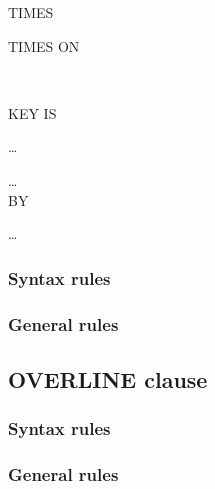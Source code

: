 \begin{syntax}
   \integer TIMES
\end{syntax}

\begin{syntax}[\miscextcolour]
  \begin{0-1}
    \integer {}
  \end{0-1}
   TIMES  ON \identifier

  \begin{0+}
    \begin{1=}
      \begin{1=}
         \\
      \end{1=}
      KEY IS
      \begin{1=}
        \identifier
      \end{1=}\ldots
    \end{1=}\ldots \\

     BY
    \begin{1=}
      \cobolindexname
    \end{1=}\ldots
  \end{0+}
\end{syntax}

\subsubsection{Syntax rules}

\subsubsection{General rules}

\subsection{OVERLINE clause}

\begin{syntax}[\miscextcolour]
\end{syntax}

\subsubsection{Syntax rules}

\subsubsection{General rules}

